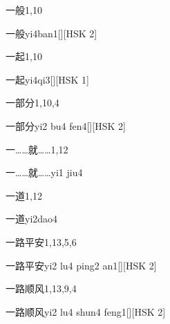 \begin{entry}{一般}{1,10}
  \begin{phonetics}{一般}{yi4ban1}[][HSK 2]
  \end{phonetics}
\end{entry}

\begin{entry}{一起}{1,10}
  \begin{phonetics}{一起}{yi4qi3}[][HSK 1]
  \end{phonetics}
\end{entry}

\begin{entry}{一部分}{1,10,4}
  \begin{phonetics}{一部分}{yi2 bu4 fen4}[][HSK 2]
  \end{phonetics}
\end{entry}

\begin{entry}{一……就……}{1,12}
  \begin{phonetics}{一……就……}{yi1 jiu4}
  \end{phonetics}
\end{entry}

\begin{entry}{一道}{1,12}
  \begin{phonetics}{一道}{yi2dao4}
  \end{phonetics}
\end{entry}

\begin{entry}{一路平安}{1,13,5,6}
  \begin{phonetics}{一路平安}{yi2 lu4 ping2 an1}[][HSK 2]
  \end{phonetics}
\end{entry}

\begin{entry}{一路顺风}{1,13,9,4}
  \begin{phonetics}{一路顺风}{yi2 lu4 shun4 feng1}[][HSK 2]
  \end{phonetics}
\end{entry}


